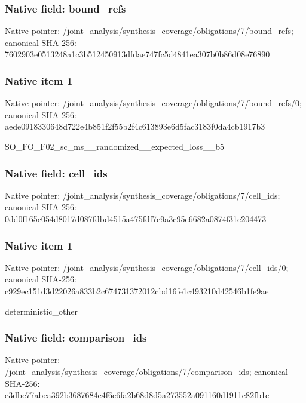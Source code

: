 \documentclass[10pt,a4paper]{article}
\begin{document}
\subsubsection{Native field: bound\_\allowbreak{}refs}
Native pointer: /joint\_\allowbreak{}analysis/synthesis\_\allowbreak{}coverage/obligations/7/bound\_\allowbreak{}refs; canonical SHA-256: 7602903e0513248a1c3b512450913dfdae747fc5d4841ea307b0b86d08e76890

\subsubsection{Native item 1}
Native pointer: /joint\_\allowbreak{}analysis/synthesis\_\allowbreak{}coverage/obligations/7/bound\_\allowbreak{}refs/0; canonical SHA-256: aede0918330648d722e4b851f2f55b2f4c613893e6d5fac3183f0da4cb1917b3

\begingroup\raggedright\sloppy SO\_\allowbreak{}FO\_\allowbreak{}F02\_\allowbreak{}sc\_\allowbreak{}ms\_\allowbreak{}\_\allowbreak{}randomized\_\allowbreak{}\_\allowbreak{}expected\_\allowbreak{}loss\_\allowbreak{}\_\allowbreak{}b5\par\endgroup

\subsubsection{Native field: cell\_\allowbreak{}ids}
Native pointer: /joint\_\allowbreak{}analysis/synthesis\_\allowbreak{}coverage/obligations/7/cell\_\allowbreak{}ids; canonical SHA-256: 0dd0f165c054d8017d087fdbd4515a475fdf7c9a3c95e6682a0874f31c204473

\subsubsection{Native item 1}
Native pointer: /joint\_\allowbreak{}analysis/synthesis\_\allowbreak{}coverage/obligations/7/cell\_\allowbreak{}ids/0; canonical SHA-256: c929ec151d3d22026a833b2c674731372012cbd16fe1c493210d42546b1fe9ae

\begingroup\raggedright\sloppy deterministic\_\allowbreak{}other\par\endgroup

\subsubsection{Native field: comparison\_\allowbreak{}ids}
Native pointer: /joint\_\allowbreak{}analysis/synthesis\_\allowbreak{}coverage/obligations/7/comparison\_\allowbreak{}ids; canonical SHA-256: e3dbc77abea392b3687684e4f6c6fa2b68d8d5a273552a091160d1911c82fb1c
\end{document}
